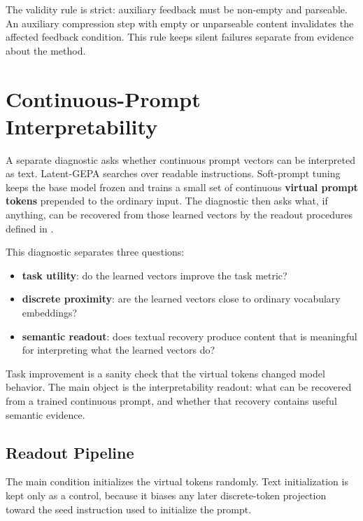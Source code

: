 \documentclass[12pt,a4paper,twoside,openright]{book}
\begin{document}
The validity rule is strict: auxiliary feedback must be non-empty and parseable.
An auxiliary compression step with empty or unparseable content invalidates the
affected feedback condition. This rule keeps silent failures separate from
evidence about the method.

\section{Continuous-Prompt Interpretability}
\label{sec:method-soft-prompt-readout}

A separate diagnostic asks whether continuous prompt vectors can be interpreted
as text. Latent-GEPA searches over readable instructions. Soft-prompt tuning
keeps the base model frozen and trains a small set of continuous \textbf{virtual
prompt tokens} prepended to the ordinary input. The diagnostic then asks what, if
anything, can be recovered from those learned vectors by the readout procedures
defined in .

This diagnostic separates three questions:

\begin{itemize}
    \item \textbf{task utility}: do the learned vectors improve the task metric?
    \item \textbf{discrete proximity}: are the learned vectors close to ordinary
    vocabulary embeddings?
    \item \textbf{semantic readout}: does textual recovery produce content that
    is meaningful for interpreting what the learned vectors do?
\end{itemize}

Task improvement is a sanity check that the virtual tokens changed model
behavior. The main object is the interpretability readout: what can be recovered
from a trained continuous prompt, and whether that recovery contains useful
semantic evidence.

\subsection{Readout Pipeline}
\label{subsec:method-soft-prompt-pipeline}

The main condition initializes the virtual tokens randomly. Text initialization is
kept only as a control, because it biases any later discrete-token projection
toward the seed instruction used to initialize the prompt.
\end{document}

